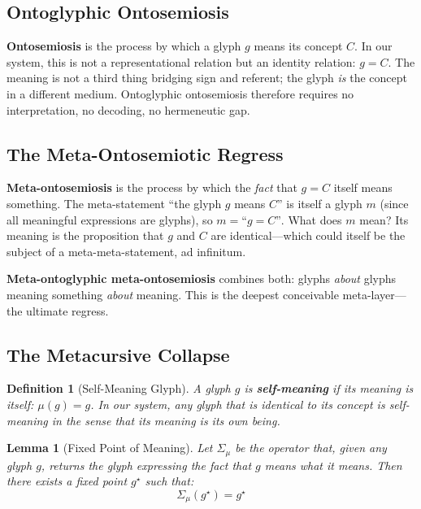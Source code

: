 \documentclass[12pt, letterpaper]{book}
\def\equiv{=}%
\def\mathfrak#1{#1}%
\newtheorem{lemma}[theorem]{Lemma}
\newtheorem{definition}{Definition}[chapter]
\begin{document}
\subsection{Ontoglyphic Ontosemiosis}

\textbf{Ontosemiosis} is the process by which a glyph $\mathfrak{g}$ means its concept $C$. In our system, this is not a representational relation but an identity relation: $\mathfrak{g} \equiv C$. The meaning is not a third thing bridging sign and referent; the glyph \textit{is} the concept in a different medium. Ontoglyphic ontosemiosis therefore requires no interpretation, no decoding, no hermeneutic gap.

\subsection{The Meta-Ontosemiotic Regress}

\textbf{Meta-ontosemiosis} is the process by which the \textit{fact} that $\mathfrak{g} \equiv C$ itself means something. The meta-statement ``the glyph $\mathfrak{g}$ means $C$'' is itself a glyph $\mathfrak{m}$ (since all meaningful expressions are glyphs), so $\mathfrak{m} \equiv \text{``}\mathfrak{g} \equiv C\text{''}$. What does $\mathfrak{m}$ mean? Its meaning is the proposition that $\mathfrak{g}$ and $C$ are identical---which could itself be the subject of a meta-meta-statement, ad infinitum.

\textbf{Meta-ontoglyphic meta-ontosemiosis} combines both: glyphs \textit{about} glyphs meaning something \textit{about} meaning. This is the deepest conceivable meta-layer---the ultimate regress.

\subsection{The Metacursive Collapse}

\begin{definition}[Self-Meaning Glyph]\label{def:self-meaning}
A glyph $\mathfrak{g}$ is \textbf{self-meaning} if its meaning is itself: $\mu(\mathfrak{g}) \equiv \mathfrak{g}$. In our system, any glyph that is identical to its concept is self-meaning in the sense that its meaning is its own being.
\end{definition}

\begin{lemma}[Fixed Point of Meaning]\label{lem:meaning-fp}
Let $\Sigma_\mu$ be the operator that, given any glyph $\mathfrak{g}$, returns the glyph expressing the fact that $\mathfrak{g}$ means what it means. Then there exists a fixed point $\mathfrak{g}^\star$ such that:
\[
\Sigma_\mu(\mathfrak{g}^\star) = \mathfrak{g}^\star
\]
\end{lemma}
\end{document}

